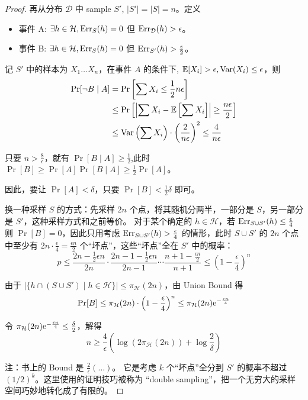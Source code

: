 \begin{proof}
    再从分布 $\mathcal{D}$ 中 sample $S'$, $|S'|=|S|=n$。定义
    \begin{itemize}[noitemsep]
        \item 事件 A: $\exists h \in \mathcal{H}, \text{Err}_S(h)=0$ 但 $\text{Err}_{\mathcal{D}}(h) > \epsilon$。
        \item 事件 B: $\exists h \in \mathcal{H}, \text{Err}_S(h)=0$ 但 $\text{Err}_{S'}(h) > \frac{\epsilon}{2}$。
    \end{itemize}
    
    记 $S'$ 中的样本为 $X_1 \dots X_n$，在事件 $A$ 的条件下, $\mathbb{E}[X_i] > \epsilon, \text{Var}(X_i) \le \epsilon$，则
    \begin{align*}
        \Pr[\neg B \mid A] &= \Pr\left[\sum X_i \le \frac{1}{2}n\epsilon\right] \\
        &\le \Pr\left[\left|\sum X_i - \mathbb{E}\left[\sum X_i\right]\right| \ge \frac{n\epsilon}{2}\right] \\
        &\le \text{Var}\left(\sum X_i\right) \cdot \left(\frac{2}{n\epsilon}\right)^2 \le \frac{4}{n\epsilon}
    \end{align*}

    只要 $n > \frac{8}{\epsilon}$，就有 $\Pr[B \mid A] \ge \frac{1}{2}$,此时 $\Pr[B] \ge \Pr[A]\Pr[B \mid A] \ge \frac{1}{2}\Pr[A]$。
    
    因此，要让 $\Pr[A] < \delta$，只要 $\Pr[B] < \frac{1}{2}\delta$ 即可。

    换一种采样 $S$ 的方式：先采样 $2n$ 个点，将其随机分两半，一部分是 $S$，另一部分是 $S'$，这种采样方式和之前等价。
    对于某个确定的 $h \in \mathcal{H}$，若 $\text{Err}_{S \cup S'}(h) \le \frac{\epsilon}{4}$ 则 $\Pr[B]=0$，因此只用考虑 $\text{Err}_{S \cup S'}(h) > \frac{\epsilon}{4}$ 的情形，此时 $S \cup S'$ 的 $2n$ 个点中至少有 $2n \cdot \frac{\epsilon}{4} = \frac{\epsilon n}{2}$ 个“坏点”，这些“坏点”全在 $S'$ 中的概率：
    \[
        p \le \frac{2n - \frac{1}{2}\epsilon n}{2n} \cdot \frac{2n-1-\frac{1}{2}\epsilon n}{2n-1} \cdots \frac{n+1-\frac{\epsilon n}{2}}{n+1} \le \left(1-\frac{\epsilon}{4}\right)^n
    \]
    
    由于 $|\{h \cap (S \cup S') \mid h \in \mathcal{H}\}| \le \pi_{\mathcal{H}}(2n)$，由 Union Bound 得
    \[
        \Pr[B] \le \pi_{\mathcal{H}}(2n) \cdot \left(1-\frac{\epsilon}{4}\right)^n \le \pi_{\mathcal{H}}(2n) \mathrm{e}^{-\frac{\epsilon n}{4}}
    \]
    
    令 $\pi_{\mathcal{H}}(2n) \mathrm{e}^{-\frac{\epsilon n}{4}} \le \frac{\delta}{2}$，解得
    \[
        n \ge \frac{4}{\epsilon} \left(\log (2\pi_{\mathcal{H}}(2n)) + \log \frac{2}{\delta}\right)
    \]
    
    注：书上的 Bound 是 $\frac{2}{\epsilon} (\dots)$。
    它是考虑 $k$ 个“坏点”全分到 $S'$ 的概率不超过 $(1/2)^k$。这里使用的证明技巧被称为 ``double sampling''，把一个无穷大的采样空间巧妙地转化成了有限的。
\end{proof}

